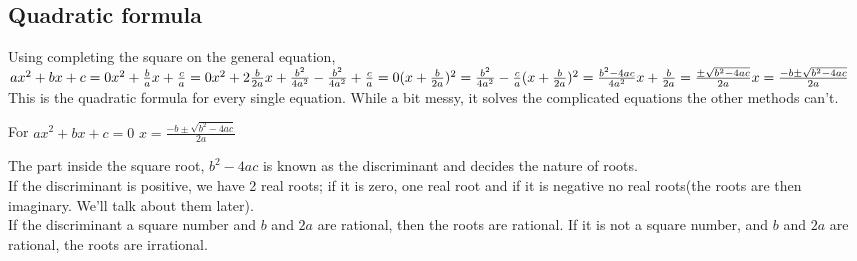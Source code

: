 \subsection{Quadratic formula}
Using completing the square on the general equation,
$ax^2+bx+c=0\\
x^2+\frac{b}{a}x+\frac{c}{a}=0\\
x^2+2\frac{b}{2a}x+\frac{b^2}{4a^2}-\frac{b^2}{4a^2}+\frac{c}{a}=0\\
(x+\frac{b}{2a})^2=\frac{b^2}{4a^2}-\frac{c}{a}\\
(x+\frac{b}{2a})^2=\frac{b^2-4ac}{4a^2}\\
x+\frac{b}{2a}=\frac{\pm \sqrt{b^2-4ac}}{2a}\\
x=\frac{-b \pm \sqrt{b^2-4ac}}{2a}$\\
This is the quadratic formula for every single equation. While a bit messy, it solves the complicated equations the other methods can't.
\begin{theorem}
   For $ax^2+bx+c=0$
   $x=\frac{-b \pm \sqrt{b^2-4ac}}{2a}$
\end{theorem}
The part inside the square root, $b^2-4ac$ is known as the discriminant and decides the nature of roots.\\
If the discriminant is positive, we have 2 real roots; if it is zero, one real root and if it is negative no real roots(the roots are then imaginary. We'll talk about them later).\\
If the discriminant a square number and $b$ and $2a$ are rational, then the roots are rational. If it is not a square number, and $b$ and $2a$ are rational, the roots are irrational.\\
